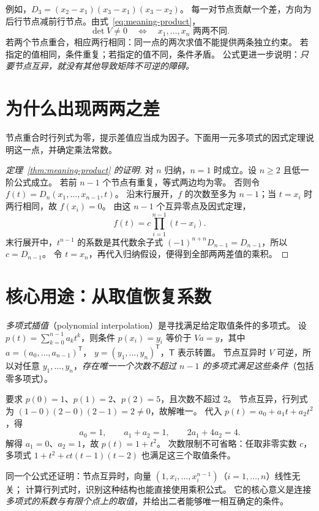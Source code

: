 \documentclass[UTF8,12pt,a4paper,fontset=fandol]{ctexart}
\begin{document}
例如，$D_3=(x_2-x_1)(x_3-x_1)(x_3-x_2)$。
每一对节点贡献一个差，方向为后行节点减前行节点。由式~\eqref{eq:meaning-product}，
\[
  \det V\ne0\quad\Longleftrightarrow\quad x_1,\ldots,x_n\text{ 两两不同}.
\]
若两个节点重合，相应两行相同：同一点的两次求值不能提供两条独立约束。
若指定的值相同，条件重复；若指定的值不同，条件矛盾。
公式更进一步说明：\emph{只要节点互异，就没有其他导致矩阵不可逆的障碍。}

\section{为什么出现两两之差}

节点重合时行列式为零，提示差值应当成为因子。下面用一元多项式的因式定理说明这一点，并确定乘法常数。

\begin{proof}[定理~\ref{thm:meaning-product} 的证明]
对 $n$ 归纳，$n=1$ 时成立。设 $n\geq2$ 且低一阶公式成立。
若前 $n-1$ 个节点有重复，等式两边均为零。
否则令 $f(t)=D_n(x_1,\ldots,x_{n-1},t)$。
沿末行展开，$f$ 的次数至多为 $n-1$；当 $t=x_i$ 时两行相同，故 $f(x_i)=0$。
由这 $n-1$ 个互异零点及因式定理，
\[
  f(t)=c\prod_{i=1}^{n-1}(t-x_i).
\]
末行展开中，$t^{n-1}$ 的系数是其代数余子式
$(-1)^{n+n}D_{n-1}=D_{n-1}$，所以 $c=D_{n-1}$。
令 $t=x_n$，再代入归纳假设，便得到全部两两差值的乘积。
\end{proof}

\section{核心用途：从取值恢复系数}

\emph{多项式插值}（polynomial interpolation）是寻找满足给定取值条件的多项式。
设 $p(t)=\sum_{k=0}^{n-1}a_kt^k$，则条件 $p(x_i)=y_i$ 等价于
$Va=y$，其中 $a=(a_0,\ldots,a_{n-1})^{\mathsf T}$，
$y=(y_1,\ldots,y_n)^{\mathsf T}$，$\mathsf T$ 表示转置。
节点互异时 $V$ 可逆，所以对任意 $y_1,\ldots,y_n$，\emph{存在唯一一个次数不超过 $n-1$ 的多项式满足这些条件}（包括零多项式）。

\begin{example}[三个取值确定多项式]
要求 $p(0)=1$、$p(1)=2$、$p(2)=5$，且次数不超过 $2$。
节点互异，行列式为 $(1-0)(2-0)(2-1)=2\ne0$，故解唯一。
代入 $p(t)=a_0+a_1t+a_2t^2$，得
\[
  a_0=1,\qquad a_1+a_2=1,\qquad 2a_1+4a_2=4.
\]
解得 $a_1=0$、$a_2=1$，故 $p(t)=1+t^2$。
次数限制不可省略：任取非零实数 $c$，多项式
$1+t^2+ct(t-1)(t-2)$ 也满足这三个取值条件。
\end{example}

同一个公式还证明：节点互异时，向量 $(1,x_i,\ldots,x_i^{n-1})$（$i=1,\ldots,n$）线性无关；
计算行列式时，识别这种结构也能直接使用乘积公式。
它的核心意义是连接\emph{多项式的系数与有限个点上的取值}，并给出二者能够唯一相互确定的条件。
\end{document}
